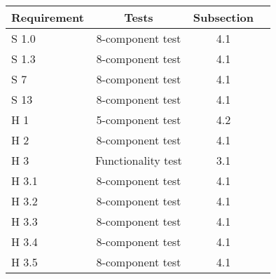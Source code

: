 \documentclass[12pt]{article}
\begin{document}
\begin{tabular}{lccc}
Requirement & Tests & Subsection\\
\hline
S 1.0       & 8-component test   & 4.1 \\
S 1.3       & 8-component test   & 4.1 \\
S 7         & 8-component test   & 4.1 \\
S 13        & 8-component test   & 4.1 \\
H 1         & 5-component test   & 4.2 \\
H 2         & 8-component test   & 4.1 \\
H 3         & Functionality test & 3.1 \\
H 3.1       & 8-component test   & 4.1 \\
H 3.2       & 8-component test   & 4.1 \\
H 3.3       & 8-component test   & 4.1 \\
H 3.4       & 8-component test   & 4.1 \\
H 3.5       & 8-component test   & 4.1
\end{tabular}
\end{document}

